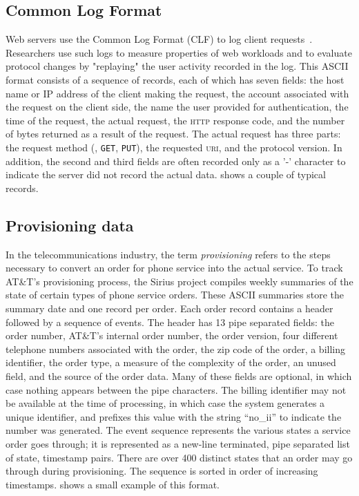\documentclass[times]{acm-sigplan}
\newcommand{\dibbler}{Sirius}
\begin{document}
\subsection{Common Log Format}
Web servers use the Common Log Format (CLF) to log client
requests~\cite{wpp}.  Researchers use such logs to measure
properties of web workloads and to evaluate protocol changes
by "replaying" the user activity recorded in the log.
This ASCII format consists of a sequence of
records, each of which has seven fields: the host name or IP address
of the client making the request, the account associated with the
request on the client side, the name the user provided for
authentication, the time of the request, the actual request, the
\textsc{http} response code, and the number of bytes returned as a
result of the request.  The actual request has three parts: the
request method (\eg, \texttt{GET}, \texttt{PUT}), the requested
\textsc{uri}, and the protocol version.  In addition, the second and
third fields are often recorded only as a '-' character to indicate
the server did not record the actual data.  
shows a couple of typical records.


\subsection{Provisioning data}
In the telecommunications industry, the term \textit{provisioning} refers to the steps necessary to convert an order for phone service into the actual 
service.  
To track AT\&T's provisioning process, the \dibbler{} project compiles
weekly summaries of the state of certain types of phone service orders.  
These ASCII summaries store the summary date and one record per order.
Each order record contains a header followed by a sequence of events.
The header has 13 pipe separated fields: the order number, AT\&T's
internal order number, the order version, four different telephone
numbers associated with the order, the zip code of the order, a
billing identifier, the order type, a measure of the complexity of the
order, an unused field, and the source of the order data.  Many of
these fields are optional, in which case nothing appears between the
pipe characters.  The billing identifier may not be available at the
time of processing, in which case the system generates a unique
identifier, and prefixes this value with the string ``no\_ii'' to
indicate the number was generated. The event sequence represents the
various states a service order goes through; it is represented as a
new-line terminated, pipe separated list of state, timestamp pairs.
There are over 400 distinct states that an order may go through during
provisioning.  The sequence is sorted in order of increasing timestamps.  shows a small example of
this format.
\end{document}
